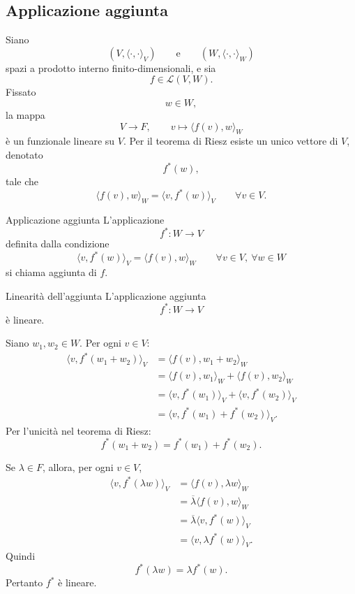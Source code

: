 \documentclass[a4paper]{article}
\begin{document}
\subsection{Applicazione aggiunta}

Siano
\[
    (V,\langle\cdot,\cdot\rangle_V)
    \qquad
    \text{e}
    \qquad
    (W,\langle\cdot,\cdot\rangle_W)
\]
spazi a prodotto interno finito-dimensionali, e sia
\[
    f\in\mathcal{L}(V,W).
\]
Fissato
\[
    w\in W,
\]
la mappa
\[
    V\to F,
    \qquad
    v\mapsto \langle f(v),w\rangle_W
\]
è un funzionale lineare su \(V\). Per il teorema di Riesz esiste un unico vettore di \(V\), denotato
\[
    f^*(w),
\]
tale che
\[
    \langle f(v),w\rangle_W
    =
    \langle v,f^*(w)\rangle_V
    \qquad
    \forall v\in V.
\]

\begin{snippetdefinition}{Applicazione aggiunta}
    L'applicazione
    \[
        f^*:W\to V
    \]
    definita dalla condizione
    \[
        \langle v,f^*(w)\rangle_V
        =
        \langle f(v),w\rangle_W
        \qquad
        \forall v\in V,\ \forall w\in W
    \]
    si chiama aggiunta di \(f\).
\end{snippetdefinition}

\begin{snippetproposition}{Linearità dell'aggiunta}
    L'applicazione aggiunta
    \[
        f^*:W\to V
    \]
    è lineare.
\end{snippetproposition}

\begin{snippetproof}{}
    Siano \(w_1,w_2\in W\). Per ogni \(v\in V\):
    \begin{align*}
        \langle v,f^*(w_1+w_2)\rangle_V
        &=
        \langle f(v),w_1+w_2\rangle_W\\
        &=
        \langle f(v),w_1\rangle_W+\langle f(v),w_2\rangle_W\\
        &=
        \langle v,f^*(w_1)\rangle_V+\langle v,f^*(w_2)\rangle_V\\
        &=
        \langle v,f^*(w_1)+f^*(w_2)\rangle_V.
    \end{align*}
    Per l'unicità nel teorema di Riesz:
    \[
        f^*(w_1+w_2)=f^*(w_1)+f^*(w_2).
    \]

    Se \(\lambda\in F\), allora, per ogni \(v\in V\),
    \begin{align*}
        \langle v,f^*(\lambda w)\rangle_V
        &=
        \langle f(v),\lambda w\rangle_W\\
        &=
        \overline{\lambda}\langle f(v),w\rangle_W\\
        &=
        \overline{\lambda}\langle v,f^*(w)\rangle_V\\
        &=
        \langle v,\lambda f^*(w)\rangle_V.
    \end{align*}
    Quindi
    \[
        f^*(\lambda w)=\lambda f^*(w).
    \]
    Pertanto \(f^*\) è lineare.
\end{snippetproof}
\end{document}
